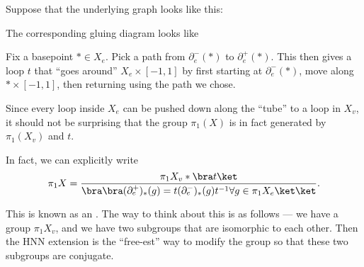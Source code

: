 \documentclass[a4paper]{article}
\begin{document}
\begin{eg}
  Suppose that the underlying graph looks like this:
  \begin{center}
  \end{center}
  The corresponding gluing diagram looks like
  \begin{center}
  \end{center}
  Fix a basepoint $* \in X_e$. Pick a path from $\partial_e^-(*)$ to $\partial_e^+(*)$. This then gives a loop $t$ that ``goes around'' $X_e \times [-1, 1]$ by first starting at $\partial_e^-(*)$, move along $* \times [-1, 1]$, then returning using the path we chose.

  Since every loop inside $X_e$ can be pushed down along the ``tube'' to a loop in $X_v$, it should not be surprising that the group $\pi_1(X)$ is in fact generated by $\pi_1(X_v)$ and $t$.

  In fact, we can explicitly write
  \[
    \pi_1 X = \frac{\pi_1 X_v * \bra t\ket}{\bra \bra(\partial_e^+)_*(g) = t (\partial_e^-)_*(g) t^{-1} \forall g \in \pi_1 X_e\ket \ket}.
  \]

  This is known as an . The way to think about this is as follows --- we have a group $\pi_1 X_v$, and we have two subgroups that are isomorphic to each other. Then the HNN extension is the ``free-est'' way to modify the group so that these two subgroups are conjugate.
\end{eg}
\end{document}
